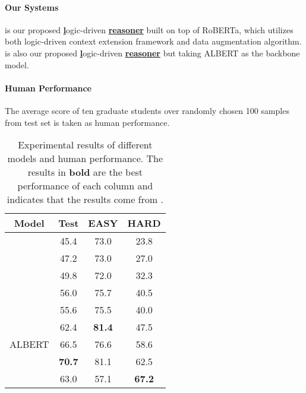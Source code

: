 \documentclass[11pt,a4paper]{article}
\begin{document}
\paragraph{Our Systems} \emph{} is our proposed \underline{\bf l}ogic-driven \underline{\bf reasoner} built on top of RoBERTa, which utilizes both logic-driven context extension framework and data augmentation algorithm. \emph{} is also our proposed \underline{\bf l}ogic-driven \underline{\bf reasoner} but taking ALBERT as the backbone model. 
\paragraph{Human Performance} The average score of ten graduate students over randomly chosen 100 samples from test set is taken as human performance.
\begin{table}[!th]
    \setlength\tabcolsep{5pt}
    \newcommand{\tabincell}[2]{\begin{tabular}{@{}#1@{}}#2\end{tabular}}
	\centering
	\begin{tabular}{c|ccc}
    \toprule
    \bf Model & \bf Test & \bf EASY & \bf HARD \\
	\midrule 
     & 45.4 & 73.0 & 23.8 \\
     & 47.2 & 73.0 & 27.0 \\
     & 49.8 & 72.0 & 32.3 \\
     & 56.0 & 75.7 & 40.5 \\
	\midrule 
     & 55.6 & 75.5 & 40.0 \\
     & 62.4 & \bf 81.4 & 47.5 \\
	\midrule 
    ALBERT & 66.5 & 76.6 & 58.6 \\
     & \bf 70.7 & 81.1 & 62.5 \\
	\midrule  
	 & 63.0 & 57.1 & \bf 67.2 \\
	\bottomrule
 	\end{tabular}
	\caption{Experimental results of different models and human performance. The results in \textbf{bold} are the best performance of each column and  indicates that the results come from \citet{yu2020reclor}.}
	\label{table_result_1}
\end{table}
\end{document}
